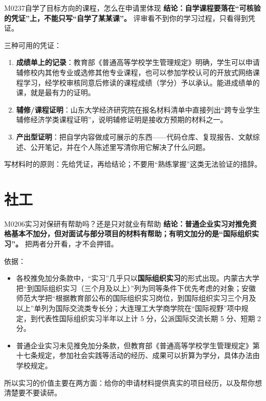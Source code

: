 \begin{qa}{M0237}{自学了目标方向的课程，怎么在申请里体现}
\textbf{结论：自学课程要落在“可核验的凭证”上，不能只写“自学了某某课”。} 评审看不到你的学习过程，只看得到凭证。

三种可用的凭证：
\begin{enumerate}
  \item \textbf{成绩单上的记录}：教育部《普通高等学校学生管理规定》明确，学生可以申请辅修校内其他专业或选修其他专业课程，也可以参加学校认可的开放式网络课程学习，经学校审核同意后修读的课程成绩（学分）予以承认。能进成绩单的课，就是最有力的证明。
  \item \textbf{辅修/课程证明}：山东大学经济研究院在报名材料清单中直接列出“跨专业学生辅修经济学类课程证明”，说明辅修证明是接收方预期的材料之一。
  \item \textbf{产出型证明}：把自学内容做成可展示的东西——代码仓库、复现报告、文献综述、公开笔记，并在个人陈述里写清你用它解决了什么问题。
\end{enumerate}

写材料时的原则：先给凭证，再给结论；不要用“熟练掌握”这类无法验证的措辞。
\end{qa}

\section{社工}
\begin{qa}{M0206}{实习对保研有帮助吗？还是只对就业有帮助}
\textbf{结论：普通企业实习对推免资格基本不加分，但对面试与部分项目的材料有帮助；有明文加分的是“国际组织实习”。} 把两者分开看，才不会押错。

依据：
\begin{itemize}
  \item 各校推免加分条款中，“实习”几乎只以\textbf{国际组织实习}的形式出现。内蒙古大学把“到国际组织实习（三个月及以上）”列为同等条件下优先考虑的对象；安徽师范大学把“根据教育部公布的国际组织实习岗位，到国际组织实习三个月及以上”单列为国际交流类专长分；大连理工大学商学院在“国际视野”项中规定，到代表性国际组织实习半年以上计 5 分，公派国际交流长期 5 分、短期 2 分。
  \item 普通企业实习未见推免加分条款，但教育部《普通高等学校学生管理规定》第十七条规定，参加社会实践等活动的经历、成果可以折算为学分，具体办法由学校规定。
\end{itemize}

所以实习的价值主要在两方面：给你的申请材料提供真实的项目经历，以及帮你想清楚要不要读研。
\end{qa}

